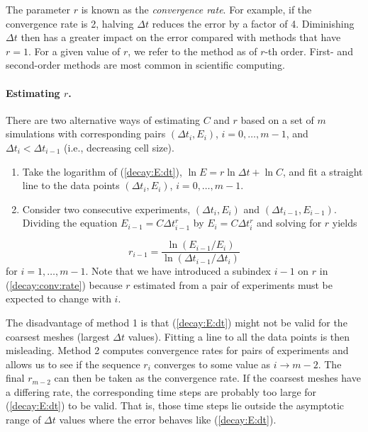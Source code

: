 \documentclass[graybox,sectrefs,envcountresetchap,open=right,final]{svmonodo}
\begin{document}
The parameter $r$ is known as the \emph{convergence rate}. For example,
if the convergence rate is 2, halving $\Delta t$ reduces the error by
a factor of 4. Diminishing $\Delta t$ then has a greater impact on
the error compared with methods that have $r=1$. For a given value of $r$,
we refer to the method as of $r$-th order. First- and second-order
methods are most common in scientific computing.

\paragraph{Estimating $r$.}
There are two alternative ways of estimating $C$ and $r$ based on a set of
$m$ simulations with corresponding pairs $(\Delta t_i, E_i)$, $i=0,\ldots,m-1$,
and $\Delta t_{i} < \Delta t_{i-1}$ (i.e., decreasing cell size).

\begin{enumerate}
 \item Take the logarithm of (\ref{decay:E:dt}), $\ln E = r\ln \Delta t + \ln C$,
    and fit a straight line to the data points $(\Delta t_i, E_i)$,
    $i=0,\ldots,m-1$.

 \item Consider two consecutive experiments, $(\Delta t_i, E_i)$ and
    $(\Delta t_{i-1}, E_{i-1})$. Dividing the equation
    $E_{i-1}=C\Delta t_{i-1}^r$ by $E_{i}=C\Delta t_{i}^r$ and solving
    for $r$ yields
\end{enumerate}

\noindent
\begin{equation}
r_{i-1} = \frac{\ln (E_{i-1}/E_i)}{\ln (\Delta t_{i-1}/\Delta t_i)}
\label{decay:conv:rate}
\end{equation}
for $i=1,\ldots,m-1$. Note that we have introduced a subindex $i-1$
on $r$ in (\ref{decay:conv:rate}) because $r$ estimated from
a pair of experiments must be expected to change with $i$.

The disadvantage of method 1 is that (\ref{decay:E:dt}) might not be valid
for the coarsest meshes (largest $\Delta t$ values). Fitting a line
to all the data points is then misleading.  Method 2 computes
convergence rates for pairs of experiments and allows us to see
if the sequence $r_i$ converges to some value as $i\rightarrow m-2$.
The final $r_{m-2}$ can then be taken as the convergence rate.
If the coarsest meshes have a differing rate, the corresponding
time steps are probably too large for (\ref{decay:E:dt}) to be valid.
That is, those time steps lie outside the asymptotic range of
$\Delta t$ values where the error behaves like (\ref{decay:E:dt}).
\end{document}
